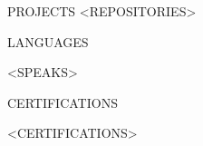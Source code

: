 \documentclass{resume}
\begin{document}
\vspace{1.5em}


\begin{rSection}{PROJECTS}    
    <REPOSITORIES>
\end{rSection}
\vspace{1.5em}


\begin{rSection}{LANGUAGES}

\begin{itemize}
    <SPEAKS>
\end{itemize}

\end{rSection}




\begin{rSection}{CERTIFICATIONS}

    \begin{itemize}
        <CERTIFICATIONS>
    \end{itemize}
    
    \end{rSection}
    
    
    \vspace{1.5em}

    
    
\end{document}
